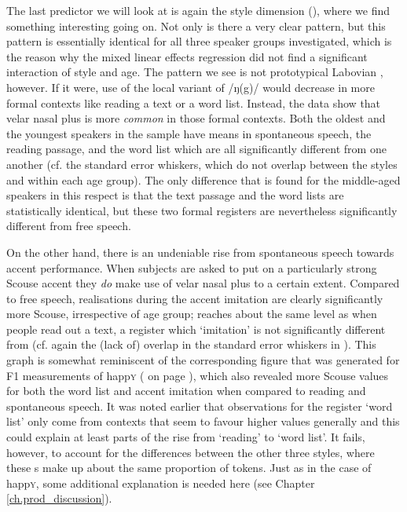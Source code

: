 The last predictor we will look at is again the style dimension (), where we find something interesting going on.
Not only is there a very clear pattern, but this pattern is essentially identical for all three speaker groups investigated, which is the reason why the mixed linear effects regression did not find a significant interaction of style and age.
The pattern we see is not prototypical Labovian , however.
If it were, use of the local variant of /ŋ(g)/ would decrease in more formal contexts like reading a text or a word list.
Instead, the data show that velar nasal plus is more \emph{common} in those formal contexts.
Both the oldest and the youngest speakers in the sample have means in spontaneous speech, the reading passage, and the word list which are all significantly different from one another (cf. the standard error whiskers, which do not overlap between the styles and within each age group).
The only difference that is found for the middle-aged speakers in this respect is that the text passage and the word lists are statistically identical, but these two formal registers are nevertheless significantly different from free speech.

On the other hand, there is an undeniable rise from spontaneous speech towards accent performance.
When subjects are asked to put on a particularly strong Scouse accent they \emph{do} make use of velar nasal plus to a certain extent.
Compared to free speech, realisations during the accent imitation are clearly significantly more Scouse, irrespective of age group;  reaches about the same level as when people read out a text, a register which `imitation' is not significantly different from (cf. again the (lack of) overlap in the standard error whiskers in ).
This graph is somewhat reminiscent of the corresponding figure that was generated for F1 measurements of happ\textsc{y} ( on page \pageref{fig.line.f1w.happy.tot}), which also revealed more Scouse values for both the word list and accent imitation when compared to reading and spontaneous speech.
It was noted earlier that observations for the register `word list' only come from contexts that seem to favour higher  values generally and this could explain at least parts of the rise from `reading' to `word list'.
It fails, however, to account for the differences between the other three styles, where these s make up about the same proportion of tokens.
Just as in the case of happ\textsc{y}, some additional explanation is needed here (see Chapter \ref{ch.prod_discussion}).

